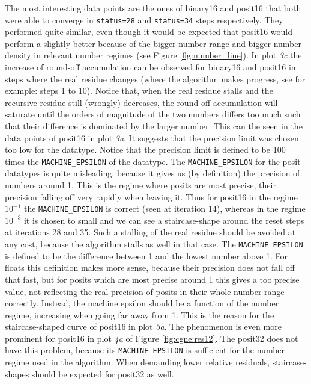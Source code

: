 \documentclass{article}
\theoremstyle{plain} %
\theoremstyle{convention} %
\theoremstyle{remark} %
\def\code#1{\texttt{#1}}
\numberwithin{equation}{section}
\begin{document}
The most interesting data points are the ones of \gls{binary16} and \gls{posit16} that both were able to converge in \code{status=28} and \code{status=34} steps respectively. They performed quite similar, even though it would be expected that \gls{posit16} would perform a slightly better because of the bigger number range and bigger number density in relevant number regimes (see Figure \ref{fig:number_line}). In plot \textit{3c} the increase of round-off accumulation can be observed for \gls{binary16} and \gls{posit16} in steps where the real residue changes (where the algorithm makes progress, see for example: steps \num{1} to \num{10}). Notice that, when the real residue stalls and the recursive residue still (wrongly) decreases, the round-off accumulation will saturate until the orders of magnitude of the two numbers differs too much such that their difference is dominated by the larger number. This can the seen in the data points of \gls{posit16} in plot \textit{3a}. It suggests that the precision limit was chosen too low for the datatype. Notice that the precision limit is defined to be \num{100} times the \code{MACHINE\_EPSILON} of the datatype. The \code{MACHINE\_EPSILON} for the posit datatypes is quite misleading, because it gives us (by definition) the precision of numbers around \num{1}. This is the regime where posits are most precise, their precision falling off very rapidly when leaving it. Thus for \gls{posit16} in the regime $10^{-1}$ the \code{MACHINE\_EPSILON} is correct (seen at iteration \num{14}), whereas in the regime $10^{-3}$ it is chosen to small and we can see a staircase-shape around the reset steps at iterations \num{28} and \num{35}. Such a stalling of the real residue should be avoided at any cost, because the algorithm stalls as well in that case. The \code{MACHINE\_EPSILON} is defined to be the difference between \num{1} and the lowest number above \num{1}. For floats this definition makes more sense, because their precision does not fall off that fast, but for posits which are most precise around \num{1} this gives a too precise value, not reflecting the real precision of posits in their whole number range correctly. Instead, the machine epsilon should be a function of the number regime, increasing when going far away from \num{1}. This is the reason for the staircase-shaped curve of \gls{posit16} in plot \textit{3a}. The phenomenon is even more prominent for \gls{posit16} in plot \textit{4a} of Figure \ref{fig:cgne:res12}. The \gls{posit32} does not have this problem, because its \code{MACHINE\_EPSILON} is sufficient for the number regime used in the algorithm. When demanding lower relative residuals, staircase-shapes should be expected for \gls{posit32} as well.
\end{document}
